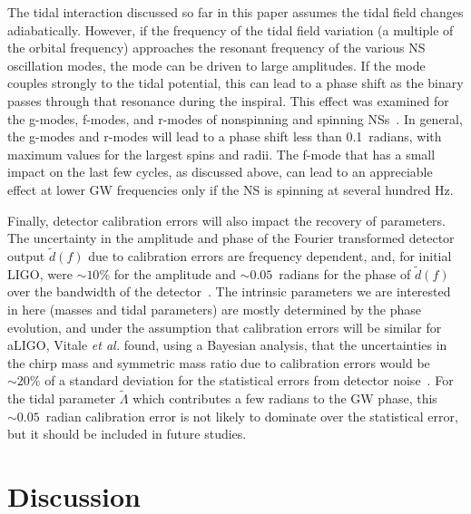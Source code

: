 \documentclass[twocolumn,prd,amssymb,aps,nofootinbib,showpacs,epsf]{revtex4}
\begin{document}
The tidal interaction discussed so far in this paper assumes the tidal field changes adiabatically. However, if the frequency of the tidal field variation (a multiple of the orbital frequency) approaches the resonant frequency of the various NS oscillation modes, the mode can be driven to large amplitudes. If the mode couples strongly to the tidal potential, this can lead to a phase shift as the binary passes through that resonance during the inspiral. This effect was examined for the g-modes, f-modes, and r-modes of nonspinning and spinning NSs~\cite{Lai1994, HoLai1999}. In general, the g-modes and r-modes will lead to a phase shift less than 0.1~radians, with maximum values for the largest spins and radii. The f-mode that has a small impact on the last few cycles, as discussed above, can lead to an appreciable effect at lower GW frequencies only if the NS is spinning at several hundred Hz. 


Finally, detector calibration errors will also impact the recovery of parameters. The uncertainty in the amplitude and phase of the Fourier transformed detector output $\tilde d(f)$ due to calibration errors are frequency dependent, and, for initial LIGO, were $\sim 10\%$ for the amplitude and $\sim 0.05$~radians for the phase of $\tilde d(f)$ over the bandwidth of the detector~\cite{VitaleDelPozzoLi2012}. The intrinsic parameters we are interested in here (masses and tidal parameters) are mostly determined by the phase evolution, and under the assumption that calibration errors will be similar for aLIGO, Vitale {\it et al.} found, using a Bayesian analysis, that the uncertainties in the chirp mass and symmetric mass ratio due to calibration errors would be $\sim 20\%$ of a standard deviation for the statistical errors from detector noise~\cite{VitaleDelPozzoLi2012}. For the tidal parameter $\tilde\Lambda$ which contributes a few radians to the GW phase, this $\sim 0.05$~radian calibration error is not likely to dominate over the statistical error, but it should be included in future studies.

\section{Discussion}
\label{sec:discussion}
\end{document}
